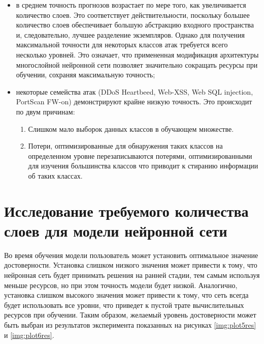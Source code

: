 \begin{itemize}
    \item в среднем точность прогнозов возрастает
    по мере того, как увеличивается количество слоев. Это соответствует действительности, 
    поскольку большее количество слоев обеспечивает большую абстракцию
    входного пространства и, следовательно, лучшее разделение экземпляров. Однако для получения максимальной
    точности для некоторых классов атак требуется всего несколько уровней. Это означает, что примененная модификация архитектуры 
    многослойной нейронной сети позволяет 
    значительно сокращать ресурсы при обучении, сохраняя максимальную точность;
    \item некоторые семейства атак (DDoS Heartbeed, Web-XSS, Web SQL injection, PortScan FW-on) демонстрируют крайне низкую точность. Это происходит по двум причинам:
        \begin{enumerate}
            \item Слишком мало выборок данных классов в обучающем множестве.
            \item Потери, оптимизированные для обнаружения таких классов на определенном уровне
                    перезаписываются потерями, оптимизированными для изучения большинства классов что приводит к стиранию информации об таких классах.
        \end{enumerate}
\end{itemize}


\section{Исследование требуемого количества слоев для модели нейронной сети}

Во время обучения модели пользователь может установить оптимальное значение достоверности. 
Установка слишком низкого значения может привести к тому, что нейронная сеть будет принимать решения 
на ранней стадии, тем самым используя меньше ресурсов, но при этом точность модели будет низкой.
Аналогично, установка слишком высокого значения может привести к тому, что сеть
всегда будет использовать все уровни, что приведет к пустой трате вычислительных ресурсов при обучении.
Таким образом, желаемый уровень достоверности может быть выбран из результатов эксперимента 
показанных на рисунках \ref*{img:plot5res} и \ref*{img:plot6res}.





